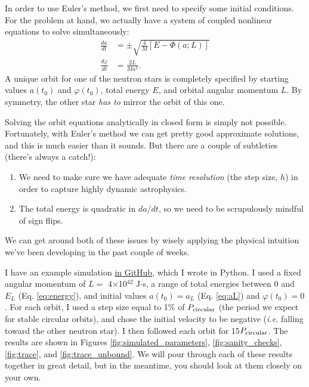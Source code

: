 \documentclass[11pt]{article}
\begin{document}
\begin{enumerate}
\hspace{15pt} In order to use Euler's method, we first need to specify some initial conditions. For the problem at hand, we actually have a system of coupled nonlinear equations to solve simultaneously:
\begin{align*}
\frac{da}{dt} &= \pm \sqrt{ \frac{4}{M} \left[ E - \Phi(a; L) \right] } \\
\frac{d\varphi}{dt} &= \frac{2L}{Ma^2}.
\end{align*}
A unique orbit for one of the neutron stars is completely specified by starting values $a(t_0)$ and $\varphi(t_0)$, total energy $E$, and orbital angular momentum $L$. By symmetry, the other star \emph{has to} mirror the orbit of this one.

\hspace{2pt} Solving the orbit equations analytically in closed form is simply not possible. Fortunately, with Euler's method we can get pretty good approximate solutions, and this is much easier than it sounds. But there are a couple of subtleties (there's always a catch!):
\begin{enumerate}
\item We need to make sure we have adequate \textit{time resolution} (the step size, $h$) in order to capture highly dynamic astrophysics.

\item The total energy is quadratic in $da/dt$, so we need to be scrupulously mindful of sign flips.
\end{enumerate}
We can get around both of these issues by wisely applying the physical intuition we've been developing in the past couple of weeks.

\hspace{15pt}I have an example simulation \href{https://github.com/alurban/mentoring/blob/master/tidal_distortion/scripts/kepler_orbits.py}{in GitHub}, which I wrote in Python. I used a fixed angular momentum of $L=$ 4$\times$10$^{42}$ J$\cdot$s, a range of total energies between 0 and $E_L$ (Eq. \ref{eq:energy}), and initial values $a(t_0) = a_L$ (Eq. \ref{eq:aL}) and $\varphi(t_0) = 0$. For each orbit, I used a step size equal to 1\% of $P_{\rm circular}$ (the period we expect for stable circular orbits), and chose the initial velocity to be negative (\textit{i.e.} falling toward the other neutron star). I then followed each orbit for 15$P_{\rm circular}$. The results are shown in Figures \ref{fig:simulated_parameters}, \ref{fig:sanity_checks}, \ref{fig:trace}, and \ref{fig:trace_unbound}. We will pour through each of these results together in great detail, but in the meantime, you should look at them closely on your own.

\end{enumerate}
\end{document}
